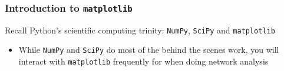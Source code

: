 \documentclass[xcolor=dvipsnames, 9pt]{beamer}
\begin{document}
\begin{frame}[fragile]
    \frametitle{Introduction to \texttt{matplotlib}}
    Recall Python's scientific computing trinity: \texttt{NumPy}, \texttt{SciPy} and \texttt{matplotlib}
    \begin{itemize}
        \item While \texttt{NumPy} and \texttt{SciPy} do most of the behind the scenes work, you will interact with \texttt{matplotlib} frequently for when doing network analysis
    \end{itemize}
\end{frame}



\end{document}
